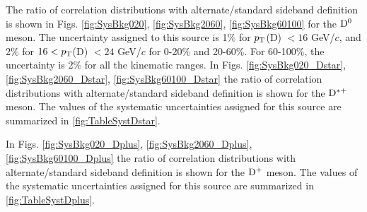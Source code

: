 The ratio of correlation distributions with alternate/standard sideband definition is shown in Figs. \ref{fig:SysBkg020}, \ref{fig:SysBkg2060}, \ref{fig:SysBkg60100} for the ${\rm D^0}$ meson. The uncertainty assigned to this source is 1\% for $p_{\rm T}$(D) $< 16$ GeV/$c$, and 2\% for $16 < p_{\rm T}$(D) $< 24$ GeV/$c$ for 0-20\% and 20-60\%. For 60-100\%, the uncertainty is 2\% for all the kinematic ranges.
In Figs. \ref{fig:SysBkg020_Dstar}, \ref{fig:SysBkg2060_Dstar}, \ref{fig:SysBkg60100_Dstar} the ratio of correlation distributions with alternate/standard sideband definition is shown for the ${\rm D^{*+}}$ meson. The values of the systematic uncertainties assigned for this source are summarized in \ref{fig:TableSystDstar}.

In Figs. \ref{fig:SysBkg020_Dplus}, \ref{fig:SysBkg2060_Dplus}, \ref{fig:SysBkg60100_Dplus} the ratio of correlation distributions with alternate/standard sideband definition is shown for the ${\rm D^+}$ meson. The values of the systematic uncertainties assigned for this source are summarized in \ref{fig:TableSystDplus}.

